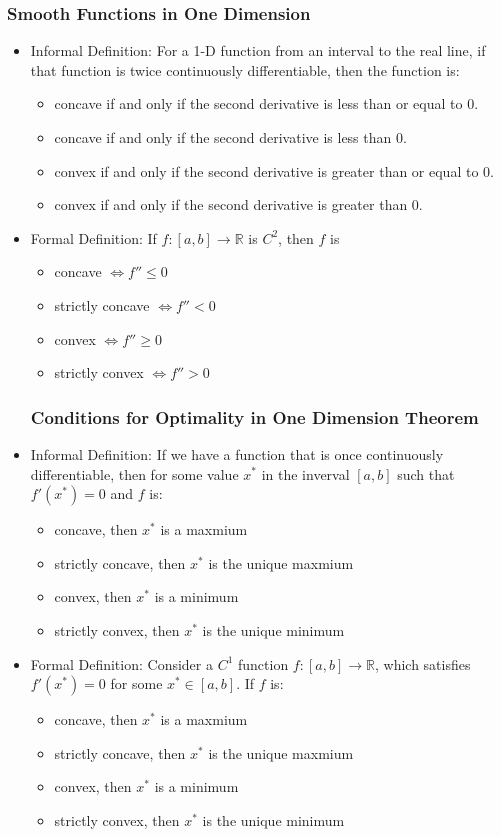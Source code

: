 \documentclass{article}
\begin{document}
\subsubsection{Smooth Functions in One Dimension}
\begin{itemize}
    \item Informal Definition: For a 1-D function from an interval to the real 
    line, if that function is twice continuously differentiable, then the
    function is:
    \begin{itemize}
        \item concave if and only if the second derivative is less than or equal
        to 0.
        \item concave if and only if the second derivative is less than 0. 
        \item convex if and only if the second derivative is greater than or 
        equal to 0.
        \item convex if and only if the second derivative is greater than 0.  
    \end{itemize}
    \item Formal Definition: If $ f : [a,b] \rightarrow \mathbb{R} $ is $ C^2 $, 
    then $ f $ is 
    \begin{itemize}
        \item concave $ \iff f'' \le 0 $ 
        \item strictly concave $ \iff f'' <  0 $ 
        \item convex $ \iff f'' \ge 0 $ 
        \item strictly convex $ \iff f'' >  0 $ 
    \end{itemize} 
\subsubsection{Conditions for Optimality in One Dimension Theorem}
\item Informal Definition: If we have a function that is once continuously 
differentiable, then for some value $ x^* $ in the inverval $ [a,b] $ such that 
$ f'(x^*) = 0 $ and $ f $ is:
\begin{itemize}
    \item concave, then $ x^* $ is a maxmium
    \item strictly concave, then $ x^* $ is the unique maxmium
    \item convex, then $ x^* $ is a minimum
    \item strictly convex, then $ x^* $ is the unique minimum
\end{itemize} 
\item Formal Definition: Consider a $ C^1 $ function $ f : [a,b] \rightarrow  
\mathbb{R} $, which satisfies $ f'(x^*) = 0 $ for some $ x^* \in [a,b] $. If $ f
$ is:
\begin{itemize}
    \item concave, then $ x^* $ is a maxmium
    \item strictly concave, then $ x^* $ is the unique maxmium
    \item convex, then $ x^* $ is a minimum
    \item strictly convex, then $ x^* $ is the unique minimum
\end{itemize} 


\end{itemize}
\end{document}
